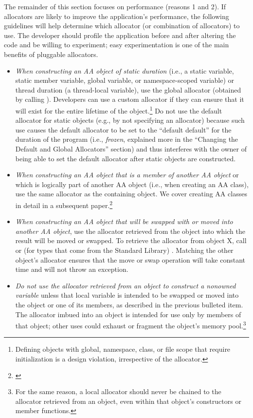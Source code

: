 The remainder of this section focuses on performance (reasons 1 and 2). If
allocators are likely to improve the application’s performance, the following
guidelines will help determine which allocator (or combination of allocators) to
use. The developer should profile the application before and after altering the
code and be willing to experiment; easy experimentation is one of the main
benefits of pluggable allocators.

\begin{itemize}
\item \emph{When constructing an AA object of static duration} (i.e., a static variable,
static member variable, global variable, or namespace-scoped variable) or
thread duration (a thread-local variable), use the global allocator
(obtained by calling ). Developers
can use a custom allocator if they can ensure that it will exist for the
entire lifetime of the object.\footnote{Defining objects with global,
namespace, class, or file scope that require initialization is a
design violation, irrespective of the allocator.}
Do not use the default allocator for static
objects (e.g., by not specifying an allocator) because such use causes the
default allocator to be set to the “default default” for the duration of the
program (i.e., \emph{frozen}, explained more in the “Changing the Default and
Global Allocators” section) and thus interferes with the owner of 
being able to set the default allocator after static objects are constructed.

\item \emph{When constructing an AA object that is a member of another AA object} or
which is logically part of another AA object (i.e., when creating an AA
class), use the same allocator as the containing object. We cover creating
AA classes in detail in a subsequent paper.\footnote{\cite{halpern20b}}

\item \emph{When constructing an AA object that will be swapped with or moved into
another AA object}, use the allocator retrieved from the object into which
the result will be moved or swapped. To retrieve the allocator from object
X, call  or (for types that come from the Standard Library)
. Matching the other object’s allocator 
ensures that the move or swap operation will take constant time and will
not throw an exception.

\item \emph{Do not use the allocator retrieved from an object to construct a nonowned
variable} unless that local variable is intended to be swapped or moved
into the object or one of its members, as described in the previous
bulleted item. The allocator imbued into an object is intended for use
only by members of that object; other uses could exhaust or fragment the
object’s memory pool.\footnote{For the same reason, a local allocator
should never be chained to the allocator retrieved from
an object, even within that object’s constructors or member functions.}


\end{itemize}

